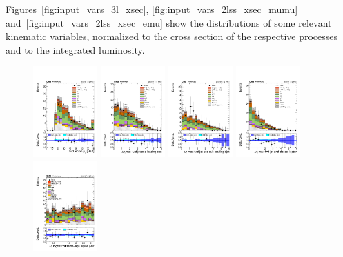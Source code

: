 Figures~\ref{fig:input_vars_3l_xsec}, \ref{fig:input_vars_2lss_xsec_mumu} and~\ref{fig:input_vars_2lss_xsec_emu} show the distributions of some relevant kinematic variables, normalized to the cross section of the respective processes and to the integrated luminosity.
\begin{figure} [!h]
 \centering
 \includegraphics[width=0.22\textwidth]{figures/3lsignal/Lep3Pt.pdf} 
 \includegraphics[width=0.22\textwidth]{figures/3lsignal/dEtaFwdJetBJet_40.pdf}
 \includegraphics[width=0.22\textwidth]{figures/3lsignal/dEtaFwdJet2BJet_40.pdf}
 \includegraphics[width=0.22\textwidth]{figures/3lsignal/dEtaFwdJetClosestLep_40.pdf} \\
 \includegraphics[width=0.22\textwidth]{figures/3lsignal/dPhiHighestPtSSPair.pdf}

\end{figure}
